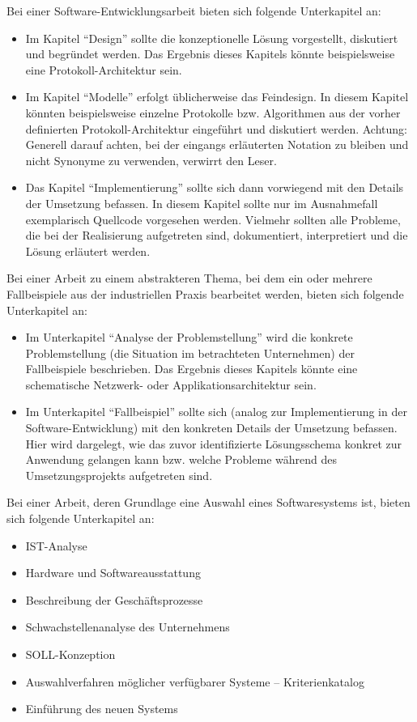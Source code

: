 Bei einer Software-Entwicklungsarbeit bieten sich folgende Unterkapitel an:
\begin{itemize}
	\item Im Kapitel \enquote{Design} sollte die konzeptionelle Lösung vorgestellt, diskutiert und begründet werden. Das Ergebnis dieses Kapitels könnte beispielsweise eine Protokoll-Architektur sein.
	\item Im Kapitel \enquote{Modelle} erfolgt üblicherweise das Feindesign. In diesem Kapitel könnten beispielsweise einzelne Protokolle bzw. Algorithmen aus der vorher definierten Protokoll-Architektur eingeführt und diskutiert werden. Achtung: Generell darauf achten, bei der eingangs erläuterten Notation zu bleiben und nicht Synonyme zu verwenden, verwirrt den Leser.
	\item Das Kapitel \enquote{Implementierung} sollte sich dann vorwiegend mit den Details der Umsetzung befassen. In diesem Kapitel sollte nur im Ausnahmefall exemplarisch Quellcode vorgesehen werden. Vielmehr sollten alle Probleme, die bei der Realisierung aufgetreten sind, dokumentiert, interpretiert und die Lösung erläutert werden.
\end{itemize}

Bei einer Arbeit zu einem abstrakteren Thema, bei dem ein oder mehrere Fallbeispiele aus der industriellen Praxis bearbeitet werden, bieten sich folgende Unterkapitel an:
\begin{itemize}
	\item Im Unterkapitel \enquote{Analyse der Problemstellung} wird die konkrete Problemstellung (die Situation im betrachteten Unternehmen) der Fallbeispiele beschrieben. Das Ergebnis dieses Kapitels könnte eine schematische Netzwerk- oder Applikationsarchitektur sein.
	\item Im Unterkapitel \enquote{Fallbeispiel} sollte sich (analog zur Implementierung in der Software-Entwicklung) mit den konkreten Details der Umsetzung befassen. Hier wird dargelegt, wie das zuvor identifizierte Lösungsschema konkret zur Anwendung gelangen kann bzw. welche Probleme während des Umsetzungsprojekts aufgetreten sind.
\end{itemize}

Bei einer Arbeit, deren Grundlage eine Auswahl eines Softwaresystems ist, bieten sich folgende Unterkapitel an:
\begin{itemize}
	\item IST-Analyse
	\item Hardware und Softwareausstattung
	\item Beschreibung der Geschäftsprozesse
	\item Schwachstellenanalyse des Unternehmens
	\item SOLL-Konzeption
	\item Auswahlverfahren möglicher verfügbarer Systeme -- Kriterienkatalog
	\item Einführung des neuen Systems
\end{itemize}

